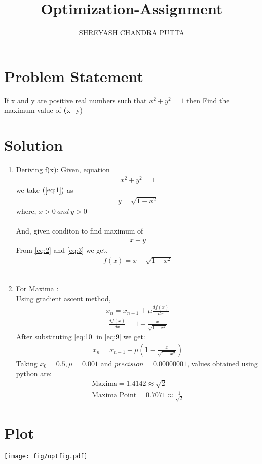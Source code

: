 \documentclass[journal,10pt,twocolumn]{article}
\title{
Optimization-Assignment
}
\author{SHREYASH CHANDRA PUTTA}
\begin{document}
\maketitle
\tableofcontents
\bigskip
\section{Problem Statement}
If x and y are positive real numbers such that $x^2 +y^2 = 1$ then Find the maximum value of \textbf(x+y)

\section{Solution}

\begin{enumerate}

 \item Deriving f(x): 
 Given, equation 
	\begin{align}
      x^2+y^2 = 1 \label{eq:1}
    \end{align}
     we take $(\ref{eq:1})$ as
    \begin{align}
      y = \sqrt{1-x^2} \label{eq:2}
    \end{align}
    where, $x > 0 \: and \: y > 0$
	\\ \\And, given conditon to find maximum of
	\begin{align}
          x+y \label{eq:3}
    \end{align}
From \ref{eq:2} and \ref{eq:3} we get, 
  \begin{align}
      f(x) = x+\sqrt{1-x^2} \label{eq:4}
    \end{align}
    \\ 
\item For Maxima : \\
    Using gradient ascent method,
\begin{align}
    x_n=x_{n-1}+\mu\frac{df(x)}{dx} \label{eq:9}
    \end{align}
    \begin{align}
    \frac{df(x)}{dx}=1-\frac{x}{\sqrt{1-x^2}} \label{eq:10}
\end{align}
After substituting \ref{eq:10} in \ref{eq:9} we get:
\begin{align}
    x_n=x_{n-1}+\mu(1-\frac{x}{\sqrt{1-x^2}})\label{eq:11}
\end{align}
Taking $x_0 = 0.5, \mu = 0.001$ and $precision = 0.00000001$, values obtained using python are:
\begin{align}
\boxed{\text{Maxima} = 1.4142 \approx \sqrt{2}} \\
\boxed{\text{Maxima Point} = 0.7071 \approx \frac{1}{\sqrt{2}}}
\end{align}
\end{enumerate}

 \section{Plot}
\texttt{[image: fig/optfig.pdf]}

\centering {}
\end{document}

